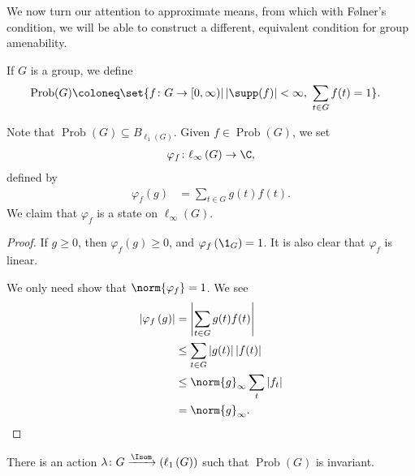 \documentclass[10pt]{mypackage}
\DeclareMathOperator{\Prob}{Prob}
\begin{document}
We now turn our attention to approximate means, from which with Følner's condition, we will be able to construct a different, equivalent condition for group amenability.
\begin{definition}
  If $G$ is a group, we define
  \begin{align*}
    \Prob(G) &\coloneq \set{f\colon G \rightarrow [0,\infty) | \left\vert \supp(f) \right\vert < \infty,~\sum_{t\in G}f(t) = 1 }.
  \end{align*}
\end{definition}
Note that $\Prob(G) \subseteq B_{\ell_1(G)}$. Given $f\in \Prob(G)$, we set
\begin{align*}
  \varphi_{f}\colon \ell_{\infty}\left(G\right) \rightarrow \C,
\end{align*}
defined by
\begin{align*}
  \varphi_{f}\left(g\right) &= \sum_{t\in G}g(t)f(t).
\end{align*}
We claim that $\varphi_{f}$ is a state on $\ell_{\infty}\left(G\right)$.
\begin{proof}
  If $g\geq 0$, then $\varphi_{f}\left(g\right) \geq 0$, and $\varphi_{f}\left(\1_{G}\right) = 1$. It is also clear that $\varphi_f$ is linear.\newline

  We only need show that $\norm{\varphi_f} = 1$. We see
  \begin{align*}
    \left\vert \varphi_{f}\left(g\right) \right\vert &= \left\vert \sum_{t\in G}g(t)f(t) \right\vert\\
                                                     &\leq \sum_{t\in G}\left\vert g(t) \right\vert\left\vert f(t) \right\vert\\
                                                     &\leq \norm{g}_{\infty}\sum_{t}\left\vert f_t \right\vert\\
                                                     &= \norm{g}_{\infty}.
  \end{align*}
\end{proof}
\begin{proposition}
  There is an action $\lambda\colon G\xrightarrow \Isom\left(\ell_{1}\left(G\right)\right)$ such that $\Prob(G)$ is invariant.
\end{proposition}
\end{document}
